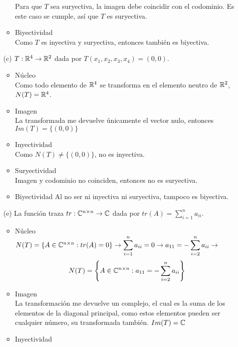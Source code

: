 \begin{mdframed}[style=s]
\begin{enumerate}
\begin{itemize}
                        Para que $T$ sea suryectiva, la imagen debe coincidir con el codominio. Es este caso se cumple, así que $T$ es suryectiva.
                    \item Biyectividad\\
                        Como $T$ es inyectiva y suryectiva, entonces también es biyectiva.
                \end{itemize}
            \item[(c)] $T:\mathbb{R}^4\to\mathbb{R}^2$ dada por $T(x_1,x_2,x_3,x_4)=(0,0)$.
                \begin{itemize}
                    \item Núcleo\\
                        Como todo elemento de $\mathbb{R}^4$ se transforma en el elemento neutro de $\mathbb{R}^2$, $N(T)=\mathbb{R}^4$.
                    \item Imagen\\
                        La transformada me devuelve únicamente el vector nulo, entonces $Im(T)=\{(0,0)\}$
                    \item Inyectividad\\
                        Como $N(T)\neq \{(0,0)\}$, no es inyectiva.
                    \item Suryectividad\\
                        Imagen y codominio no coinciden, entonces no es suryectiva.
                    \item Biyectividad
                        Al no ser ni inyectiva ni suryectiva, tampoco es biyectiva.
                \end{itemize}
            \item[(e)] La función traza $tr:\mathbb{C}^{n\times n}\to \mathbb{C}$ dada por $tr(A)=\displaystyle\sum_{i=1}^na_{ii}$.
                \begin{itemize}
                    \item Núcleo\\
                        $N(T)=\{A\in\mathbb{C}^{n\times n}:tr(A)=0\}\to \displaystyle\sum_{i=1}^na_{ii}=0\to a_{11}=-\displaystyle\sum_{i=2}^na_{ii}\to $\[N(T)=\left\{A\in\mathbb{C}^{n\times n}:a_{11}=-\displaystyle\sum_{i=2}^na_{ii}\right\}\]
                    \item Imagen\\
                        La transformación me devuelve un complejo, el cual es la suma de los elementos de la diagonal principal, como estos elementos pueden ser cualquier número, su transformada también. $Im(T)=\mathbb{C}$
                    \item Inyectividad\\

\end{itemize}
\end{enumerate}
\end{mdframed}
